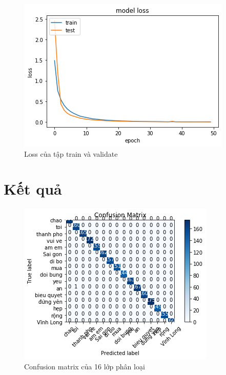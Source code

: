 \FloatBarrier
\begin{figure}[htp]
\begin{center}
\includegraphics[scale=1]{chap4/c4_figs/train_val_l.png}
\end{center}
\caption{Loss của tập train và validate}
\label{fig:pipelineS}
\end{figure}
\FloatBarrier

\section{Kết quả}

\FloatBarrier
\begin{figure}[htp]
\begin{center}
\includegraphics[scale=1]{chap4/c4_figs/confusion_matrix.png}
\end{center}
\caption{Confusion matrix của 16 lớp phân loại}
\label{fig:pipelineS}
\end{figure}
\FloatBarrier